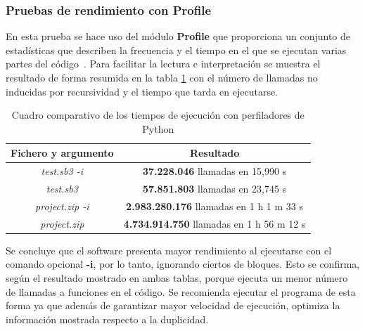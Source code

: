 \documentclass[a4paper, 12pt]{book}
\begin{document}
\subsubsection{Pruebas de rendimiento con Profile}

En esta prueba se hace uso del módulo \textbf{Profile} que proporciona un conjunto de estadísticas que describen la frecuencia y el tiempo en el que se ejecutan varias partes del código~\cite{profileWeb}. Para facilitar la lectura e interpretación se muestra el resultado de forma resumida en la tabla \ref{table:profile} con el número de llamadas no inducidas por recursividad y el tiempo que tarda en ejecutarse.

\begin{table}[!htb]
 \begin{center}
  \begin{tabular}{ | c | c |} %
	\hline
     Fichero y argumento & Resultado  \\ \hline %
	\textit{test.sb3 -i}  & \textbf{37.228.046} llamadas en 15,990 s \\ \hline
    \textit{test.sb3}  & \textbf{57.851.803} llamadas en 23,745 s \\ \hline
    \textit{project.zip -i} & \textbf{2.983.280.176} llamadas en 1 h 1 m 33 s \\ \hline
    \textit{project.zip} & \textbf{4.734.914.750} llamadas en 1 h 56 m 12 s  \\ \hline
  \end{tabular}
  \caption{Cuadro comparativo de los tiempos de ejecución con perfiladores de Python\label{table:profile}}
 \end{center}
\end{table}

Se concluye que el software presenta mayor rendimiento al ejecutarse con el comando opcional \textbf{-i}, por lo tanto, ignorando ciertos de bloques. Esto se confirma, según el resultado mostrado en ambas tablas, porque ejecuta un menor número de llamadas a funciones en el código. Se recomienda ejecutar el programa de esta forma ya que además de garantizar mayor velocidad de ejecución, optimiza la información mostrada respecto a la duplicidad.

\end{document}
